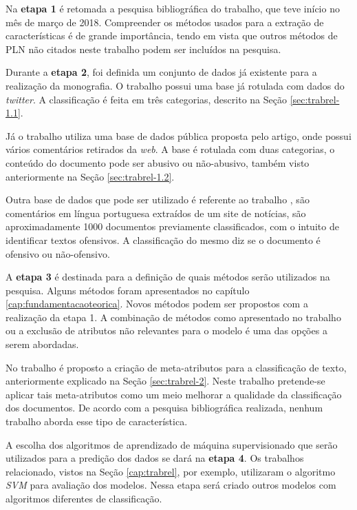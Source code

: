 Na \textbf{etapa 1} é retomada a pesquisa bibliográfica do trabalho, que teve início no mês de março de 2018. Compreender os métodos usados para a extração de características é de grande importância, tendo em vista que outros métodos de PLN não citados neste trabalho podem ser incluídos na pesquisa. 

Durante a \textbf{etapa 2}, foi definida um conjunto de dados já existente para a realização da monografia.
O trabalho \cite{davidson2017automated} possui uma base já rotulada com dados do \textit{twitter}. A classificação é feita em três categorias, descrito na Seção \ref{sec:trabrel-1.1}. 

Já o trabalho \cite{nobata2016abusive} utiliza uma base de dados pública proposta pelo artigo, onde possui vários comentários retirados da \textit{web}. A base é rotulada com duas categorias, o conteúdo do documento pode ser abusivo ou não-abusivo, também visto anteriormente na Seção \ref{sec:trabrel-1.2}. 

Outra base de dados que pode ser utilizado é referente ao trabalho \cite{Pelle2017}, são comentários em língua portuguesa extraídos de um site de notícias, são aproximadamente 1000 documentos previamente classificados, com o intuito de identificar textos ofensivos. A classificação do mesmo diz se o documento é ofensivo ou não-ofensivo.

A \textbf{etapa 3} é destinada para a definição de quais métodos serão utilizados na pesquisa. Alguns métodos foram apresentados no capítulo \ref{cap:fundamentacaoteorica}. Novos métodos podem ser propostos com a realização da etapa 1. A combinação de métodos como apresentado no trabalho \cite{nobata2016abusive} ou a exclusão de atributos não relevantes para o modelo é uma das opções a serem abordadas.

No trabalho \cite{canutoestudo} é proposto a criação de meta-atributos para a classificação de texto, anteriormente explicado na Seção \ref{sec:trabrel-2}. Neste trabalho pretende-se aplicar tais meta-atributos como um meio  melhorar a qualidade da classificação dos documentos. De acordo com a pesquisa bibliográfica realizada, nenhum trabalho aborda esse tipo de característica.

A escolha dos algoritmos de aprendizado de máquina supervisionado que serão utilizados para a predição dos dados se dará na \textbf{etapa 4}. Os trabalhos relacionado, vistos na Seção \ref{cap:trabrel}, por exemplo, utilizaram o algoritmo \textit{SVM} para avaliação dos modelos. Nessa etapa será criado outros modelos com algoritmos diferentes de classificação.

